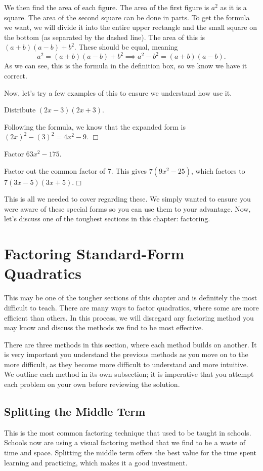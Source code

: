 \documentclass[lang=en,11pt]{elegantbook}
\begin{document}
We then find the area of each figure.  The area of the first figure is $a^2$ as it is a square.  The area of the second square can be done in parts.  To get the formula we want, we will divide it into the entire upper rectangle and the small square on the bottom (as separated by the dashed line).  The area of this is $(a+b)(a-b)+b^2$.  These should be equal, meaning $$a^2=(a+b)(a-b)+b^2 \implies a^2-b^2=(a+b)(a-b).$$
As we can see, this is the formula in the definition box, so we know we have it correct.

Now, let's try a few examples of this to ensure we understand how use it.
\begin{example}
Distribute $(2x-3)(2x+3)$.
\end{example}
\begin{solution}
Following the formula, we know that the expanded form is $(2x)^2-(3)^2=4x^2-9$.  $\Box$
\end{solution}
\begin{example}
Factor $63x^2-175$.
\end{example}
\begin{solution}
Factor out the common factor of $7$.  This gives $7(9x^2-25)$, which factors to $7(3x-5)(3x+5)$.$\Box$ 
\end{solution} 
This is all we needed to cover regarding these.  We simply wanted to ensure you were aware of these special forms so you can use them to your advantage.  Now, let's discuss one of the toughest sections in this chapter: factoring.
\section{Factoring Standard-Form Quadratics}
\noindent This may be one of the tougher sections of this chapter and is definitely the most difficult to teach.  There are many ways to factor quadratics, where some are more efficient than others.  In this process, we will disregard any factoring method you may know and discuss the methods we find to be most effective.  

There are three methods in this section, where each method builds on another.  It is very important you understand the previous methods as you move on to the more difficult, as they become more difficult to understand and more intuitive.  We outline each method in its own subsection; it is imperative that you attempt each problem on your own before reviewing the solution.
\subsection{Splitting the Middle Term}
\noindent This is the most common factoring technique that used to be taught in schools.  Schools now are using a visual factoring method that we find to be a waste of time and space.  Splitting the middle term offers the best value for the time spent learning and practicing, which makes it a good investment.
\end{document}
